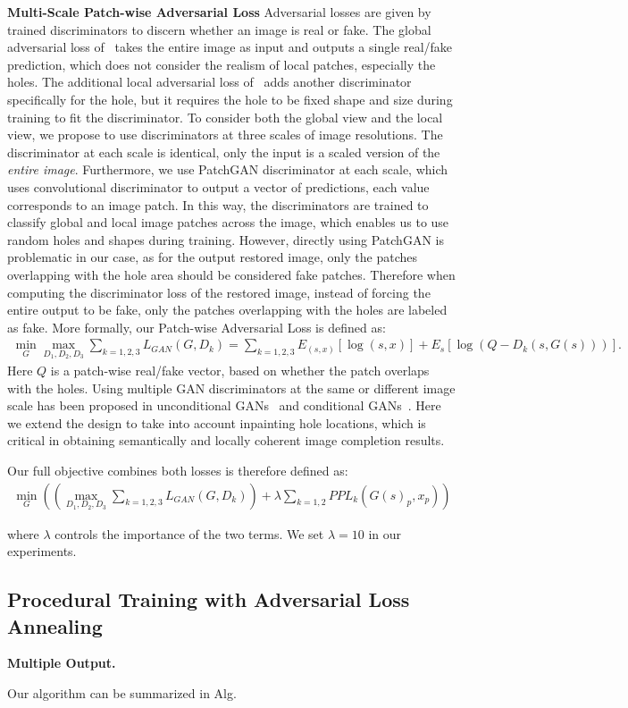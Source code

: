 \noindent\textbf{Multi-Scale Patch-wise Adversarial Loss} Adversarial losses are given by trained discriminators to discern whether an image is real or fake. The global adversarial loss of~\cite{pathak2016context} takes the entire image as input and outputs a single real/fake prediction, which does not consider the realism of local patches, especially the holes. The additional local adversarial loss of~\cite{iizuka2017globally} adds another discriminator specifically for the hole, but it requires the hole to be fixed shape and size during training to fit the discriminator. To consider both the global view and the local view, we propose to use discriminators at three scales of image resolutions. The discriminator at each scale is identical, only the input is a scaled version of the \textit{entire image}. Furthermore, we use PatchGAN discriminator at each scale, which uses convolutional discriminator to output a vector of predictions, each value corresponds to an image patch. In this way, the discriminators are trained to classify global and local image patches across the image, which enables us to use random holes and shapes during training. However, directly using PatchGAN is problematic in our case, as for the output restored image, only the patches overlapping with the hole area should be considered fake patches. Therefore when computing the discriminator loss of the restored image, instead of forcing the entire output to be fake, only the patches overlapping with the holes are labeled as fake. More formally, our Patch-wise Adversarial Loss is defined as: 
\begin{eqnarray}
\min\limits_G\max\limits_{D_1, D_2, D_3}\sum\limits_{k=1,2,3} L_{GAN}(G,D_k) = \sum\limits_{k=1,2,3}E_{(s,x)}[\log (s,x)] + E_s[\log (Q-D_k(s,G(s)))].
\end{eqnarray}
Here $Q$ is a patch-wise real/fake vector, based on whether the patch overlaps with the holes. Using multiple GAN discriminators at the same or different image scale has been proposed in unconditional GANs~\cite{durugkar2016generative} and conditional GANs~\cite{wang2017high}. Here we extend the design to take into account inpainting hole locations, which is critical in obtaining semantically and locally coherent image completion results.

Our full objective combines both losses is therefore defined as:
\begin{eqnarray}
\min\limits_G((\max\limits_{D_1, D_2, D_3}\sum\limits_{k=1,2,3} L_{GAN}(G,D_k))+\lambda\sum\limits_{k=1,2}PPL_k(G(s)_p, x_p))
\end{eqnarray}

where $\lambda$ controls the importance of the two terms. We set $\lambda=10$ in our experiments.

\subsection{Procedural Training with Adversarial Loss Annealing}
\label{sec:procedural}

\noindent\textbf{Multiple Output.}

Our algorithm can be summarized in Alg.
